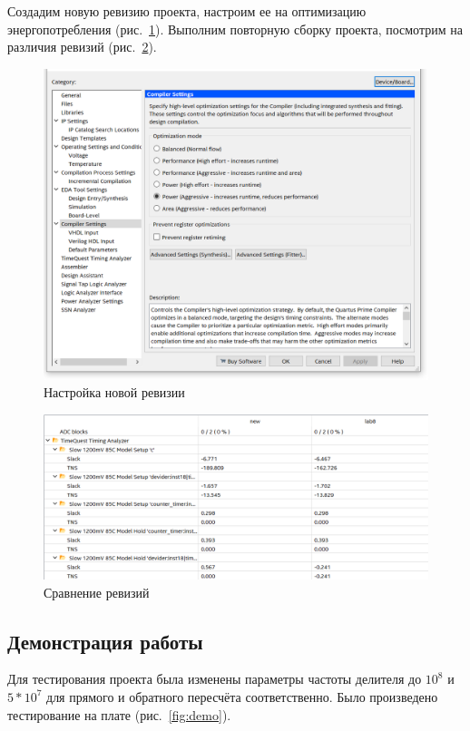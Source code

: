 \documentclass[a4paper,14pt]{article}
\begin{document}
Создадим новую ревизию проекта, настроим ее на оптимизацию энергопотребления (рис.~\ref{fig:settings}).
Выполним повторную сборку проекта, посмотрим на различия ревизий (рис.~\ref{fig:diff}).

\begin{figure}[H]
	\centering
	\includegraphics[width=0.8\linewidth]{image/settings}
	\caption{Настройка новой ревизии}
	\label{fig:settings}
\end{figure}

\begin{figure}[H]
	\centering
	\includegraphics[width=0.8\linewidth]{image/diff}
	\caption{Сравнение ревизий}
	\label{fig:diff}
\end{figure}

\subsection{Демонстрация работы}

Для тестирования проекта была изменены параметры частоты делителя до $10^8$ и $5 * 10^7$ для прямого и обратного пересчёта соответственно.
Было произведено тестирование на плате (рис.~\ref{fig:demo}).
\end{document}
